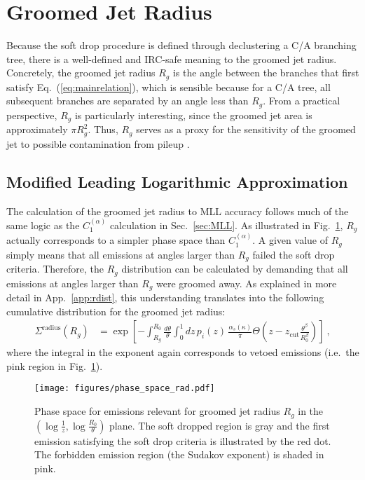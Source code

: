 \documentclass[letterpaper,11pt]{article}
\newcommand{\C}[2]{C^{(#2)}_{#1}}
\newcommand{\ea}{{\C{1}{\alpha}}}
\DeclareRobustCommand{\Sec}[1]{Sec.~\ref{#1}}
\DeclareRobustCommand{\App}[1]{App.~\ref{#1}}
\DeclareRobustCommand{\Fig}[1]{Fig.~\ref{#1}}
\DeclareRobustCommand{\Eq}[1]{Eq.~(\ref{#1})}
\begin{document}
\section{Groomed Jet Radius}
\label{sec:pileup}

Because the soft drop procedure is defined through declustering a C/A branching tree, there is a well-defined and IRC-safe meaning to the groomed jet radius.  Concretely, the groomed jet radius $R_g$ is the angle between the branches that first satisfy \Eq{eq:mainrelation}, which is sensible because for a C/A tree, all subsequent branches are separated by an angle less than $R_g$.  From a practical perspective, $R_g$ is particularly interesting, since the groomed jet area is approximately $\pi R_g^2$.  Thus, $R_g$ serves as a proxy for the sensitivity of the groomed jet to possible contamination from pileup \cite{Cacciari:2008gn,Sapeta:2010uk}.

\subsection{Modified Leading Logarithmic Approximation}
\label{sec:MLLradius}




The calculation of the groomed jet radius to MLL accuracy follows much of the same logic as the $\ea$ calculation in \Sec{sec:MLL}.  As illustrated in \Fig{fig:groomedregions-radius}, $R_g$ actually corresponds to a simpler phase space than $\ea$.  A given value of $R_g$ simply means that all emissions at angles larger than $R_g$ failed the soft drop criteria.  Therefore, the  $R_g$ distribution can be calculated by demanding that all emissions at angles larger than $R_g$ were groomed away.
As explained in more detail in \App{app:rdist}, this understanding translates into the following cumulative distribution for the groomed jet radius:
\begin{align}\label{eq:grad_exp}
\Sigma^\text{radius}(R_g) &= \exp\left[
-\int_{R_g}^{R_0} \frac{d\theta}{\theta}\int_0^1 dz\, p_i(z) \, \frac{\alpha_s(\kappa)}{\pi}\Theta\left( z- z_\text{cut}\frac{\theta^\beta}{R_0^\beta} \right)
\right] \ ,
\end{align}
where the integral in the exponent again corresponds to vetoed emissions (i.e.\ the pink region in \Fig{fig:groomedregions-radius}).


\begin{figure}
\begin{center}
\texttt{[image: figures/phase\_space\_rad.pdf]}
\end{center}
\caption{Phase space for emissions relevant for groomed jet radius $R_g$ in the $(\log \frac{1}{z},\log \frac{R_0}{\theta})$ plane.  The soft dropped region is gray and the first emission satisfying the soft drop criteria is illustrated by the red dot.  The forbidden emission region (the Sudakov exponent) is shaded in pink.
}
\label{fig:groomedregions-radius}
\end{figure}
\end{document}

